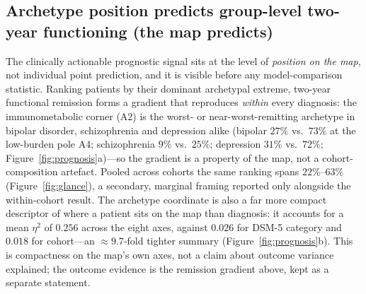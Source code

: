 \subsection{Archetype position predicts group-level two-year functioning (the map predicts)}

The clinically actionable prognostic signal sits at the level of \emph{position on the
map}, not individual point prediction, and it is visible before any model-comparison
statistic. Ranking patients by their dominant archetypal extreme, two-year functional
remission forms a gradient that reproduces \emph{within} every diagnosis: the
immunometabolic corner (A2) is the worst- or near-worst-remitting archetype in bipolar
disorder, schizophrenia and depression alike (bipolar $27\%$ vs.\ $73\%$ at the
low-burden pole A4; schizophrenia $9\%$ vs.\ $25\%$; depression $31\%$ vs.\ $72\%$;
Figure~\ref{fig:prognosis}a)---so the gradient is a property of the map, not a
cohort-composition artefact. Pooled across cohorts the same ranking spans
$22\%$--$63\%$ (Figure~\ref{fig:glance}), a secondary, marginal framing reported only
alongside the within-cohort result. The archetype coordinate is also a far more compact
descriptor of where a patient sits on the map than diagnosis: it accounts for a mean
$\eta^2$ of $0.256$ across the eight axes, against $0.026$ for DSM-5 category and
$0.018$ for cohort---an $\approx9.7$-fold tighter summary (Figure~\ref{fig:prognosis}b).
This is compactness on the map's own axes, not a claim about outcome variance
explained; the outcome evidence is the remission gradient above, kept as a separate
statement.

